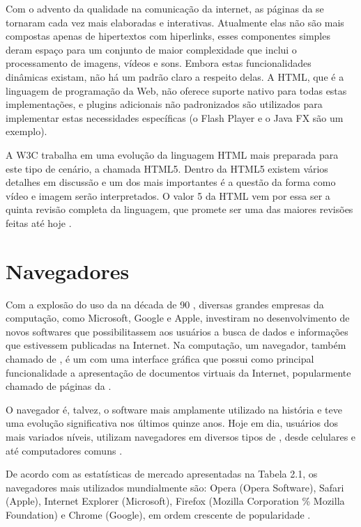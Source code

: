 \documentclass[espaco=simples,appendix=Name]{abnt}
\begin{document}
\begin{description}
Com o advento da qualidade na comunicação da internet, as páginas da  se tornaram cada vez mais elaboradas e interativas. Atualmente elas não são mais compostas apenas de hipertextos com hiperlinks, esses componentes simples deram espaço para um conjunto de maior complexidade que inclui o processamento de imagens, vídeos e sons. Embora estas funcionalidades dinâmicas existam, não há um padrão claro a respeito delas. A HTML, que é a linguagem de programação da Web, não oferece suporte nativo para todas estas implementações, e plugins adicionais não padronizados são utilizados para implementar estas necessidades específicas (o Flash Player e o Java FX são um exemplo).

A W3C trabalha em uma evolução da linguagem HTML mais preparada para este tipo de cenário, a chamada HTML5. Dentro da HTML5 existem vários detalhes em discussão e um dos mais importantes é a questão da forma como vídeo e imagem serão interpretados. O valor 5 da HTML vem por essa ser a quinta revisão completa da linguagem, que promete ser uma das maiores revisões feitas até hoje \cite{HTML5spec}.

\section{Navegadores}

\item \noindent 

Com a explosão do uso da  na década de 90 \cite{BloombergGameChangers}, diversas grandes empresas da computação, como Microsoft, Google e Apple, investiram no desenvolvimento de novos softwares que possibilitassem aos usuários a busca de dados e informações que estivessem publicadas na Internet. Na computação, um navegador, também chamado de , é um  com uma interface gráfica que possui como principal funcionalidade a apresentação de documentos virtuais da Internet, popularmente chamado de páginas da .

O navegador é, talvez, o software mais amplamente utilizado na história e teve uma evolução significativa nos últimos quinze anos. Hoje em dia, usuários dos mais variados níveis, utilizam navegadores em diversos tipos de , desde celulares e  até computadores comuns \cite{ArchitectureWebBrowsers}.

De acordo com as estatísticas de mercado apresentadas na Tabela 2.1, os navegadores mais utilizados mundialmente são: Opera (Opera Software), Safari (Apple), Internet Explorer (Microsoft), Firefox (Mozilla Corporation \% Mozilla Foundation) e Chrome (Google), em ordem crescente de popularidade \cite{W3schools}.


\end{description}
\end{document}
